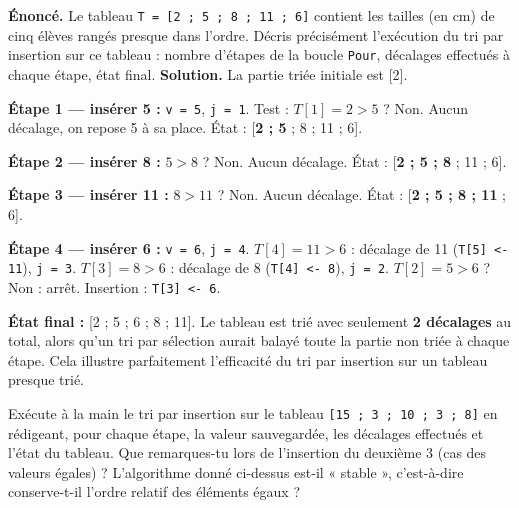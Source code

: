 \documentclass[11pt]{article}
\begin{document}
\begin{exoresolu}
\textbf{Énoncé.} Le tableau \texttt{T = [2 ; 5 ; 8 ; 11 ; 6]} contient les tailles (en cm) de cinq élèves rangés presque dans l'ordre. Décris précisément l'exécution du tri par insertion sur ce tableau : nombre d'étapes de la boucle \texttt{Pour}, décalages effectués à chaque étape, état final.
\tcblower
\textbf{Solution.} La partie triée initiale est [2].

\textbf{Étape 1 — insérer 5 :} \texttt{v = 5}, \texttt{j = 1}. Test : $T[1] = 2 > 5$ ? Non. Aucun décalage, on repose 5 à sa place. État : [\textbf{2 ; 5} ; 8 ; 11 ; 6].

\textbf{Étape 2 — insérer 8 :} $5 > 8$ ? Non. Aucun décalage. État : [\textbf{2 ; 5 ; 8} ; 11 ; 6].

\textbf{Étape 3 — insérer 11 :} $8 > 11$ ? Non. Aucun décalage. État : [\textbf{2 ; 5 ; 8 ; 11} ; 6].

\textbf{Étape 4 — insérer 6 :} \texttt{v = 6}, \texttt{j = 4}. $T[4] = 11 > 6$ : décalage de 11 (\texttt{T[5] <- 11}), \texttt{j = 3}. $T[3] = 8 > 6$ : décalage de 8 (\texttt{T[4] <- 8}), \texttt{j = 2}. $T[2] = 5 > 6$ ? Non : arrêt. Insertion : \texttt{T[3] <- 6}.

\textbf{État final :} [2 ; 5 ; 6 ; 8 ; 11]. Le tableau est trié avec seulement \textbf{2 décalages} au total, alors qu'un tri par sélection aurait balayé toute la partie non triée à chaque étape. Cela illustre parfaitement l'efficacité du tri par insertion sur un tableau presque trié.
\end{exoresolu}

\begin{exercice}
Exécute à la main le tri par insertion sur le tableau \texttt{[15 ; 3 ; 10 ; 3 ; 8]} en rédigeant, pour chaque étape, la valeur sauvegardée, les décalages effectués et l'état du tableau. Que remarques-tu lors de l'insertion du deuxième 3 (cas des valeurs égales) ? L'algorithme donné ci-dessus est-il « stable », c'est-à-dire conserve-t-il l'ordre relatif des éléments égaux ?
\end{exercice}
\end{document}
